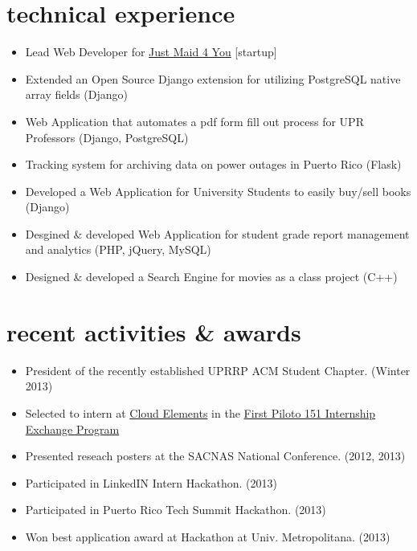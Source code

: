 \documentclass[]{friggeri-cv}
\begin{document}
\section{technical experience}

\begin{itemize}
\item Lead Web Developer for {\href{http://www.justmaid4you.com/}{Just Maid 4 You}} [startup]
\item Extended an Open Source Django extension for utilizing PostgreSQL native array fields (Django)
\item Web Application that automates a pdf form fill out process for UPR Professors (Django,
PostgreSQL)
\item Tracking system for archiving data on power outages in Puerto Rico (Flask)
\item Developed a Web Application for University Students to easily buy/sell books (Django)
\item Desgined \& developed Web Application for student grade report management and analytics (PHP, jQuery, MySQL)
\item Designed \& developed a Search Engine for movies as a class project (C++)
\end{itemize}


\section{recent activities \& awards}
\begin{itemize}
\item President of the recently established UPRRP ACM Student Chapter. (Winter 2013)
\item Selected to intern at {\href{http://www.cloud-elements.com/}{Cloud Elements}} in the {\href{www.piloto151.com/piloto151internshipexchangeprogram/}{First Piloto 151 Internship Exchange Program}}
\item Presented reseach posters at the SACNAS National Conference. (2012, 2013)
\item Participated in LinkedIN Intern Hackathon. (2013)
\item Participated in Puerto Rico Tech Summit Hackathon. (2013)
\item Won best application award at Hackathon at Univ. Metropolitana. (2013)
\end{itemize}
\end{document}
